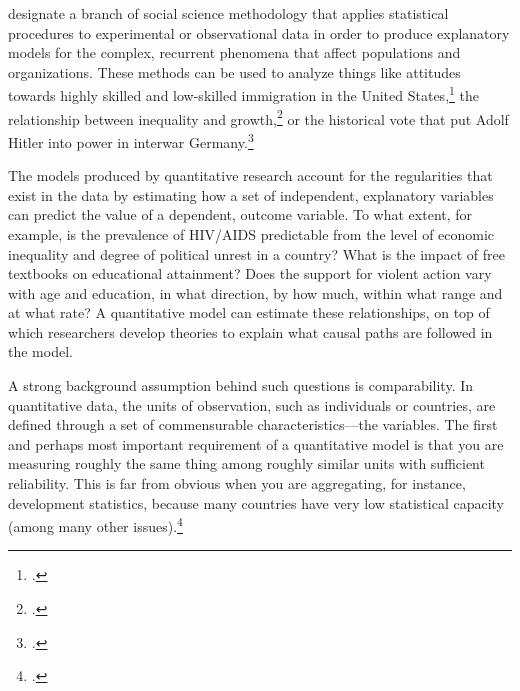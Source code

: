 %
%

%
	\label{sec:quantitative-methods}
  
	 designate a branch of social science methodology that applies statistical procedures to experimental or observational data in order to produce explanatory models for the complex, recurrent phenomena that affect populations and organizations. These methods can be used to analyze things like attitudes towards highly skilled and low-skilled immigration in the United States,\footcite{HainmuellerHiscox:2010a} the relationship between inequality and growth,\footcite{BanerjeeDuflo:2003} or the historical vote that put Adolf Hitler into power in interwar Germany.\footcite{KingRosen:2008a}%

	The models produced by quantitative research account for the regularities that exist in the data by estimating how a set of independent, explanatory variables can predict the value of a dependent, outcome variable. To what extent, for example, is the prevalence of HIV/AIDS predictable from the level of economic inequality and degree of political unrest in a country? What is the impact of free textbooks on educational attainment? Does the support for violent action vary with age and education, in what direction, by how much, within what range and at what rate? A quantitative model can estimate these relationships, on top of which researchers develop theories to explain what causal paths are followed in the model.%

	A strong background assumption behind such questions is comparability. In quantitative data, the units of observation, such as individuals or countries, are defined through a set of commensurable characteristics—the variables. The first and perhaps most important requirement of a quantitative model is that you are measuring roughly the same thing among roughly similar units with sufficient reliability. This is far from obvious when you are aggregating, for instance, development statistics, because many countries have very low statistical capacity (among many other issues).\footcite{Jerven:2013a}%

